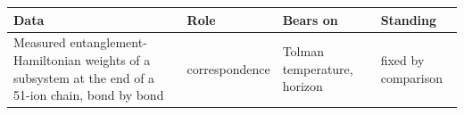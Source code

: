 \begin{tabular}{p{2.7in}lp{2.1in}l}
\toprule
\raggedright Data & Role & \raggedright Bears on & Standing \tabularnewline
\midrule
\raggedright Measured entanglement-Hamiltonian weights of a subsystem at the end of a 51-ion chain, bond by bond~\cite{JoshiEtAl2023} & correspondence & \raggedright Tolman temperature, horizon & fixed by comparison \tabularnewline
\bottomrule
\end{tabular}

